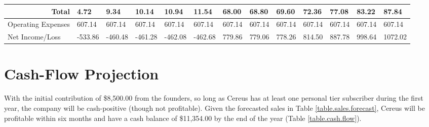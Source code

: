 \begin{sidewaystable}
\begin{table}[H]
\begin{tabularx}{\textwidth}{X X X X X X X X X X X X X}
    \multicolumn{1}{r}{Total} & 4.72 & 9.34 & 10.14 & 10.94 & 11.54 & 68.00 & 68.80 & 69.60 & 72.36 & 77.08 & 83.22 & 87.84  \\

    \hline

    \multicolumn{1}{l}{Operating Expenses} & 607.14 & 607.14 & 607.14 & 607.14 & 607.14 & 607.14 & 607.14 & 607.14 & 607.14 & 607.14 & 607.14 & 607.14  \\

    \multicolumn{1}{l}{Net Income/Loss} & -533.86 & -460.48 & -461.28 & -462.08 & -462.68 & 779.86 & 779.06 & 778.26 & 814.50 & 887.78 & 998.64 & 1072.02  \\

  \end{tabularx}
  \label{table.profit.loss}
\end{table}
\end{sidewaystable}


\section{Cash-Flow Projection}

With the initial contribution of \$8,500.00 from the founders, so long as Cereus has at least one personal tier subscriber during the first year, the company will be cash-positive (though not profitable). Given the forecasted sales in Table \ref{table.sales.forecast}, Cereus will be profitable within six months and have a cash balance of \$11,354.00 by the end of the year (Table \ref{table.cash.flow}).

